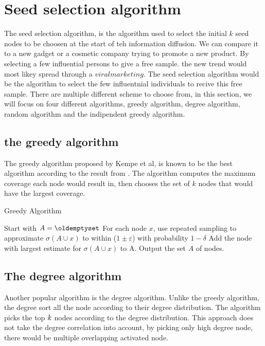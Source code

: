 {\section{Seed selection algorithm}
The seed selection algorithm, is the algorithm used to select the initial $k$ seed nodes to be choosen at the start of teh information diffusion. We can compare it to a new gadget or a cosmetic company trying to promote a new product. By selecting a few influential persons to give a free sample. the new trend would most likey spread through a $viral marketing$\cite{ViralMarketing}. The seed selection algorithm would be the algorithm to select the few influentnial individuals to recive this free sample. There are multiple different scheme to choose from, in this section, we will focus on four different algorithms, greedy algorithm, degree algorithm, random algorithm and the indipendent greedy algorithm.

\subsection{the greedy algorithm}
The greedy algorithm\cite{MaximizeSpread2015} proposed by Kempe et al, is known to be the best algorithm according to the result from \cite{MaximizeSpread2015}. The algorithm computes the maximum coverage each node would result in, then chooses the set of $k$ nodes that would have the largest coverage.  

 \begin{algorithm}
\caption{Greedy Algorithm}
\begin{algorithmic}[1]
\State Start with $A = \oldemptyset$
\State For each node $x$, use repeated sampling to approximate $\sigma(A \cup {x}) $ to within ($1 \pm \varepsilon$) with probability
$1 − \delta$
\State Add the node with largest estimate for $\sigma(A \cup {x})$ to A.
\EndWhile
\State Output the set $A$ of nodes.
\end{algorithmic}
\end{algorithm}

\subsection{The degree algorithm}
Another popular algorithm is the degree algorithm\cite{MaximizeSpread2015}. Unlike the greedy algorithm, the degree sort all the node according to their degree distribution. The algorithm picks the top $\it{k}$ nodes according to the degree distribution. This approach does not take the degree correlation into account, by picking only high degree node, there would be multiple overlapping activated node.

}
